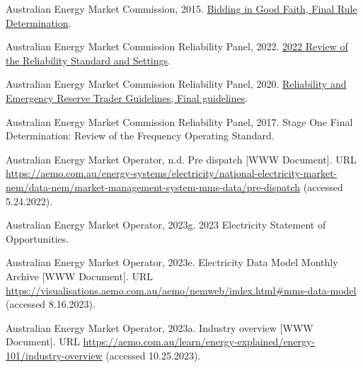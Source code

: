 \documentclass[12pt,a4paper,]{report}
\newlength{\cslhangindent}
\newenvironment{CSLReferences}[2] %
 {%
  \setlength{\parindent}{0pt}
  \ifodd #1 \everypar{\setlength{\hangindent}{\cslhangindent}}\ignorespaces\fi
  \ifnum #2 > 0
  \setlength{\parskip}{#2\baselineskip}
  \fi
 }%
 {}
\begin{document}
\begin{CSLReferences}{1}{0}
\leavevmode{}%
Australian Energy Market Commission, 2015.
\href{https://www.aemc.gov.au/sites/default/files/content/815f277c-a015-47d0-bc13-ce3d5faaf96d/Final-Determination.pdf}{Bidding
in {Good Faith}, {Final Rule Determination}}.

\leavevmode{}%
Australian Energy Market Commission Reliability Panel, 2022.
\href{https://www.aemc.gov.au/sites/default/files/2022-09/2022\%20RSS\%20Review\%20Final\%20Report\%20\%281\%29.pdf}{2022
{Review} of the {Reliability Standard} and {Settings}}.

\leavevmode{}%
Australian Energy Market Commission Reliability Panel, 2020.
\href{https://www.aemc.gov.au/sites/default/files/2020-08/Updated\%20Amended\%20Panel\%20RERT\%20Guidelines\%20-\%2018\%20August\%202020\%20-\%20Final\%20for\%20publication_0.pdf}{Reliability
and {Emergency Reserve Trader Guidelines}, {Final} guidelines}.

\leavevmode{}%
Australian Energy Market Commission Reliability Panel, 2017. Stage {One
Final Determination}: {Review} of the {Frequency Operating Standard}.

\leavevmode{}%
Australian Energy Market Operator, n.d. Pre dispatch {[}WWW Document{]}.
URL
\url{https://aemo.com.au/energy-systems/electricity/national-electricity-market-nem/data-nem/market-management-system-mms-data/pre-dispatch}
(accessed 5.24.2022).

\leavevmode{}%
Australian Energy Market Operator, 2023g. 2023 {Electricity Statement}
of {Opportunities}.

\leavevmode{}%
Australian Energy Market Operator, 2023e. Electricity {Data Model
Monthly Archive} {[}WWW Document{]}. URL
\url{https://visualisations.aemo.com.au/aemo/nemweb/index.html\#mms-data-model}
(accessed 8.16.2023).

\leavevmode{}%
Australian Energy Market Operator, 2023a. Industry overview {[}WWW
Document{]}. URL
\url{https://aemo.com.au/learn/energy-explained/energy-101/industry-overview}
(accessed 10.25.2023).


\end{CSLReferences}
\end{document}
